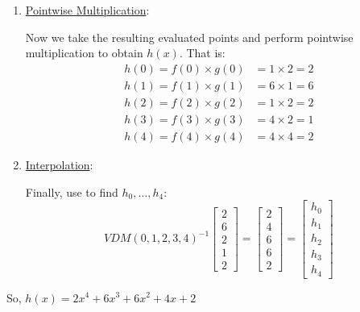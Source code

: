 \begin{example}{}{}
\begin{enumerate}
        \item \underline{Pointwise Multiplication}:

        Now we take the resulting evaluated points and perform pointwise multiplication to obtain $h(x)$.
        That is:
        \begin{align*}
            h(0) = f(0) \times g(0) &= 1 \times 2 = 2 \\
            h(1) = f(1) \times g(1) &= 6 \times 1 = 6 \\ 
            h(2) = f(2) \times g(2) &= 1 \times 2 = 2 \\
            h(3) = f(3) \times g(3) &= 4 \times 2 = 1 \\
            h(4) = f(4) \times g(4) &= 4 \times 4 = 2
        \end{align*}

        \item \underline{Interpolation}:
        
        Finally, use  to find $h_0, \ldots, h_4$:
        \begin{equation*}
            VDM(0,1,2,3,4)^{-1}
            \begin{bmatrix}
                2 \\ 6 \\ 2 \\ 1 \\ 2
            \end{bmatrix}
            = 
            \begin{bmatrix}
                2 \\ 4 \\ 6 \\ 6 \\ 2
            \end{bmatrix}
            = 
            \begin{bmatrix}
                h_0 \\ h_1 \\ h_2 \\ h_3 \\ h_4
            \end{bmatrix}
        \end{equation*}
    \end{enumerate}

    So, $h(x) = 2x^4 + 6x^3 + 6x^2 + 4x + 2$
\end{example}

